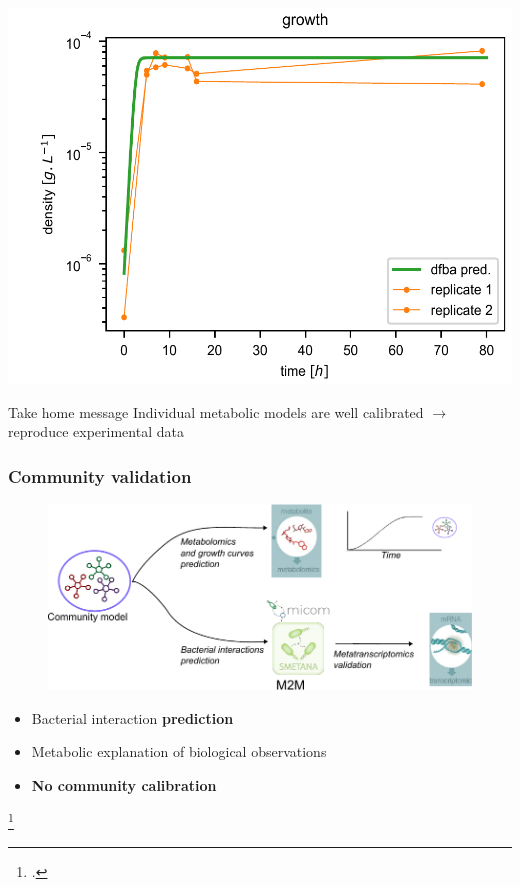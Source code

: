 \documentclass[8pt,usenames,dvipsnames]{beamer}
\begin{document}
\begin{frame}
\begin{minipage}{0.5\textwidth}
\includegraphics[width=\textwidth]{figures/validation-ll.pdf}
\end{minipage}%
\hspace{0.3cm}
\hfill
\begin{minipage}{0.4\textwidth}
\begin{block}{Take home message}
Individual metabolic models are well calibrated $\rightarrow$ reproduce experimental data
\end{block}

\end{minipage}

\end{frame}

\begin{frame}
\frametitle{Community validation}

\begin{figure}
\includegraphics[width=\textwidth]{figures/com-validation.pdf}
\end{figure}
\begin{block}{}
\begin{itemize}
\item Bacterial interaction \textbf{prediction}
\item Metabolic explanation of biological observations
\item \textbf{No community calibration}
\end{itemize}
\end{block}
\footcite{Cao2021}

\end{frame}
\end{document}
